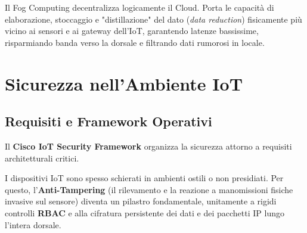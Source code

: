 \begin{center}
\end{center}

\begin{defbox}
Il Fog Computing decentralizza logicamente il Cloud. Porta le capacità di elaborazione, stoccaggio e "distillazione" del dato (\textit{data reduction}) fisicamente più vicino ai sensori e ai gateway dell'IoT, garantendo latenze bassissime, risparmiando banda verso la dorsale e filtrando dati rumorosi in locale.
\end{defbox}

\section{Sicurezza nell'Ambiente IoT}

\subsection{Requisiti e Framework Operativi}
Il \textbf{Cisco IoT Security Framework} organizza la sicurezza attorno a requisiti architetturali critici.
\begin{warnbox}
I dispositivi IoT sono spesso schierati in ambienti ostili o non presidiati. Per questo, l'\textbf{Anti-Tampering} (il rilevamento e la reazione a manomissioni fisiche invasive sul sensore) diventa un pilastro fondamentale, unitamente a rigidi controlli \textbf{RBAC} e alla cifratura persistente dei dati e dei pacchetti IP lungo l'intera dorsale.
\end{warnbox}


